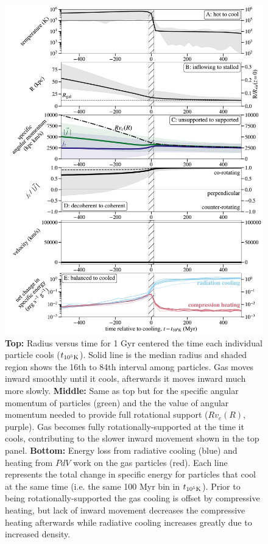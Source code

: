 \documentclass[fleqn,usenatbib]{mnras}
\begin{document}
\begin{figure}
\includegraphics[width=\textwidth]{figures/before_vs_after.pdf}
\caption{
\textbf{Top:}
Radius versus time for 1 Gyr centered the time each individual particle cools ($t_{\rm 10^5 K}$).
Solid line is the median radius and shaded region shows the 16th to 84th interval among particles.
Gas moves inward smoothly until it cools, afterwards it moves inward much more slowly.
\textbf{Middle:}
Same as top but for the specific angular momentum of particles (green) and the the value of angular momentum needed to provide full rotational support ($Rv_c(R)$, purple).
Gas becomes fully rotationally-supported at the time it cools, contributing to the slower inward movement shown in the top panel.
\textbf{Bottom:}
Energy loss from radiative cooling (blue) and heating from $PdV$ work on the gas particles (red).
Each line represents the total change in specific energy for particles that cool at the same time (i.e. the same 100 Myr bin in $t_{\rm 10^5 K}$).
Prior to being rotationally-supported the gas cooling is offset by compressive heating, but lack of inward movement decreases the compressive heating afterwards while radiative cooling increases greatly due to increased density.
}
\end{figure}
\end{document}
